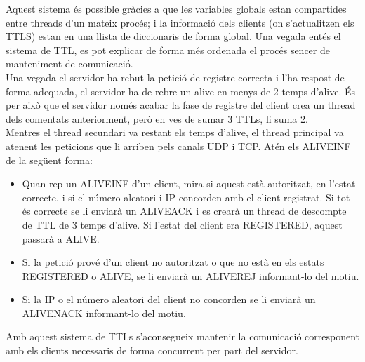\documentclass{article}
\begin{document}
Aquest sistema és possible gràcies a que les variables 
globals estan compartides entre
threads d'un mateix procés; i la informació dels clients (on s'actualitzen els
TTLS) estan en una llista de diccionaris de forma global. Una vegada entés 
el sistema de TTL, es pot explicar de forma més ordenada el procés sencer 
de manteniment de comunicació.\\

Una vegada el servidor ha rebut la petició de registre correcta i l'ha respost 
de forma adequada, el servidor ha de rebre un alive en menys de 2 temps d'alive. 
És per això que el servidor només acabar la fase de registre del client crea 
un thread dels comentats anteriorment, però en ves de sumar 3 TTLs, li suma 2.\\

Mentres el thread secundari va restant els temps d'alive, el thread principal va
atenent les peticions que li arriben pels canals UDP i TCP. Atén els 
ALIVE\textunderscore INF de la següent forma:

\begin{itemize}

\item Quan rep un ALIVE\textunderscore INF d'un client, mira si aquest 
està autoritzat, en l'estat correcte, i si el número aleatori i IP 
concorden amb el client registrat. Si tot és correcte se li enviarà 
un ALIVE\textunderscore ACK i es crearà un thread de descompte de TTL 
de 3 temps d'alive. Si l'estat del client era REGISTERED, aquest
passarà a ALIVE.\\

\item Si la petició prové d'un client no autoritzat o que no està en els 
estats REGISTERED o ALIVE, se li enviarà un ALIVE\textunderscore REJ 
informant-lo del motiu.

\item Si la IP o el número aleatori del client no concorden se li enviarà
un ALIVE\textunderscore NACK informant-lo del motiu.
\end{itemize}
Amb aquest sistema de TTLs s'aconsegueix mantenir la comunicació corresponent
amb els clients necessaris de forma concurrent per part del servidor.
\end{document}
